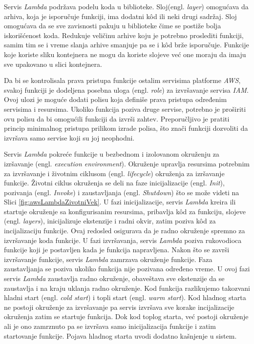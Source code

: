 \documentclass[12pt,oneside]{memoir}
\begin{document}
Servis \emph{Lambda} podržava podelu koda u biblioteke. Sloj(engl. \emph{layer}) omogućava da arhiva, koja je isporučuje funkciji, ima dodatni kôd ili neki drugi sadržaj. Sloj omogućava da se sve zavisnosti pakuju u biblioteke čime se postiže bolja iskorišćenost koda. Redukuje veličinu arhive koju je potrebno proslediti funkciji, samim tim se i vreme slanja arhive smanjuje pa se i kôd brže isporučuje. Funkcije koje koriste sliku kontejnera ne mogu da koriste slojeve već one moraju da imaju sve upakovano u slici kontejnera.

  
Da bi se kontrolisala prava pristupa funkcije ostalim servisima platforme \emph{AWS}, svakoj funkciji je dodeljena posebna uloga (engl. \emph{role}) za izvršavanje servisa \emph{IAM}. Ovoj ulozi je moguće dodati polisu koja definiše prava pristupa određenim servisima i resursima. Ukoliko funkcija poziva druge servise, potrebno je proširiti ovu polisu da bi omogućili funkciji da izvrši zahtev. Preporučljivo je pratiti princip minimalnog pristupa prilikom izrade polisa, što znači funkciji dozvoliti da izvršava samo servise koji su joj neophodni. 

  
Servis \emph{Lambda} pokreće funkcije u bezbednom i izolovanom okruženju za izršavanje (engl. \emph{execution environment}). Okruženje upravlja resursima potrebnim za izvršavanje i životnim ciklusom (engl. \emph{lifecycle}) okruženja za izršavanje funkcije. Životni ciklus okruženja se deli na faze inicijalizacije (engl. \emph{Init}), pozivanja (engl. \emph{Invoke}) i zaustavljanja (engl. \emph{Shutdown}) što se može videti na Slici \ref{fig:awsLambdaZivotniVek}. U fazi inicijalizacije, servis \emph{Lambda} kreira ili startuje okruženje sa konfigurisanim resursima, pribavlja kôd za funkciju, slojeve (engl. \emph{layers}), inicijalizuje ekstenzije i radni okvir, zatim poziva kôd za incijalizaciju funkcije. Ovaj redosled osigurava da je radno okruženje spremno za izvršavanje koda funkcije. U fazi izvršavanja, servis \emph{Lambda} poziva rukovodioca funkcije koji je postavljen kada je funkcija napravljena. Nakon što se završi izvršavanje funkcije, servis \emph{Lambda} zamrzava okruženje funkcije. Faza zaustavljanja se poziva ukoliko funkcija nije pozivana određeno vreme. U ovoj fazi servis \emph{Lambda} zaustavlja radno okruženje, obaveštava sve ekstenzije da se zaustavlja i na kraju uklanja radno okruženje. Kod funkcija razlikujemo takozvani hladni start (engl. \emph{cold start}) i topli start (engl. \emph{warm start}). Kod hladnog starta ne postoji okruženje za izvršavanje pa servis izvršava sve korake incijalizacije okruženja zatim se startuje funkcija. Dok kod toplog starta, već postoji okruženje ali je ono zamrznuto pa se izvršava samo inicijalizacija funkcije i zatim startovanje funkcije. Pojava hladnog starta uvodi dodatno kašnjenje u sistem. 
  
\end{document}
